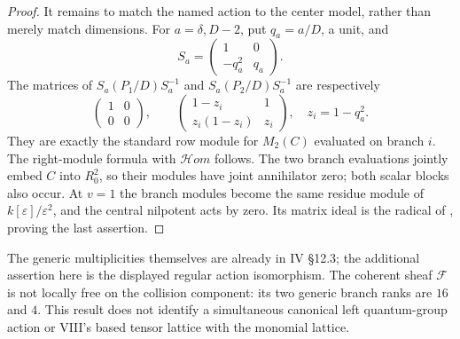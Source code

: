 \begin{proof}
It remains to match the named action to the center model, rather than
merely match dimensions. For $a=\delta,D-2$, put $q_a=a/D$, a unit, and
\[
 S_a=\begin{pmatrix}1&0\\-q_a^2&q_a\end{pmatrix}.
\]
The matrices of $S_a(P_1/D)S_a^{-1}$ and $S_a(P_2/D)S_a^{-1}$ are
respectively
\[
 \begin{pmatrix}1&0\\0&0\end{pmatrix},\qquad
 \begin{pmatrix}1-z_i&1\\z_i(1-z_i)&z_i\end{pmatrix},
 \quad z_i=1-q_a^2.
\]
They are exactly the standard row module for $M_2(C)$ evaluated on branch
$i$. The right-module formula with $\mathcal Hom$ follows. The two branch
evaluations jointly embed $C$ into $R_0^2$, so their modules have joint
annihilator zero; both scalar blocks also occur. At $v=1$ the branch
modules become the same residue module of $k[\varepsilon]/\varepsilon^2$,
and the central nilpotent acts by zero. Its matrix ideal is the radical
of , proving the last assertion.
\end{proof}
The generic multiplicities themselves are already in IV \S12.3; the
additional assertion here is the displayed regular action isomorphism.
The coherent sheaf $\mathcal F$ is not locally free on the collision
component: its two generic branch ranks are $16$ and $4$. This result
does not identify a simultaneous canonical left quantum-group action
or VIII's based tensor lattice with the monomial lattice.

